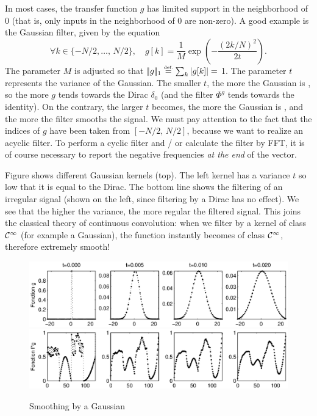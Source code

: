  
In most cases, the transfer function $ g $ has limited support in the neighborhood of $ 0 $ (that is, only inputs in the neighborhood of $ 0 $ are non-zero). A good example is the Gaussian filter, given by the equation
\begin{equation*}
\forall k \in \{- N / 2, \ldots, \, N / 2 \}, \quad g [k] = \frac{1}{M} \exp \left(- \frac{(2 k / N)^2}{2t} \right).
\end{equation*}
The parameter $ M $ is adjusted so that $ |\!| g |\!|_1 \stackrel{\mbox{\upshape\tiny def.}}{=} \sum_k{| g [k] |} = $ 1. The parameter $ t $ represents the variance of the Gaussian. The smaller $ t $, the more the Gaussian is , so the more $ g $ tends towards the Dirac $ \delta_0 $ (and the filter $ \Phi^g $ tends towards the identity). On the contrary, the larger $ t $ becomes, the more the Gaussian is , and the more the filter smooths the signal. We must pay attention to the fact that the indices of $ g $ have been taken from $ [- N / 2, \, N / 2] $, because we want to realize an acyclic filter. To perform a cyclic filter and / or calculate the filter by FFT, it is of course necessary to report the negative frequencies \textit{at the end} of the vector.
 
 
Figure  shows different Gaussian kernels (top). The left kernel has a variance $ t $ so low that it is equal to the Dirac. The bottom line shows the filtering of an irregular signal (shown on the left, since filtering by a Dirac has no effect). We see that the higher the variance, the more regular the filtered signal. This joins the classical theory of continuous convolution: when we filter by a kernel of class $ \mathcal{C}^\infty $ (for example a Gaussian), the function instantly becomes of class $ \mathcal{C}^\infty $, therefore extremely smooth!\begin{figure}[ht]
    \begin{center}
    \includegraphics[scale=0.7]{images/filtre-lissage-1.eps}
    \includegraphics[scale=0.7]{images/filtre-lissage-2.eps}
    \end{center}
    \caption{Smoothing by a Gaussian}
              \label{fig-filter-smoothing}
\end{figure}
 
